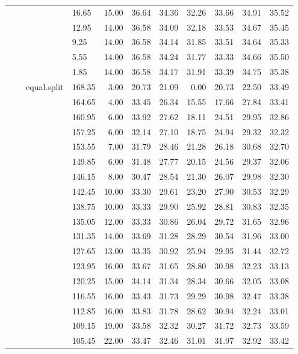 \begin{longtable}{llllrrrrrrr}
   &  &  & 16.65 & 15.00 & 36.64 & 34.36 & 32.26 & 33.66 & 34.91 & 35.52 \\ 
   &  &  & 12.95 & 14.00 & 36.58 & 34.09 & 32.18 & 33.53 & 34.67 & 35.45 \\ 
   &  &  & 9.25 & 14.00 & 36.58 & 34.14 & 31.85 & 33.51 & 34.64 & 35.33 \\ 
   &  &  & 5.55 & 14.00 & 36.58 & 34.24 & 31.77 & 33.33 & 34.66 & 35.50 \\ 
   &  &  & 1.85 & 14.00 & 36.58 & 34.17 & 31.91 & 33.39 & 34.75 & 35.38 \\ 
   &  & equal.split & 168.35 & 3.00 & 20.73 & 21.09 & 0.00 & 20.73 & 22.50 & 33.49 \\ 
   &  &  & 164.65 & 4.00 & 33.45 & 26.34 & 15.55 & 17.66 & 27.84 & 33.41 \\ 
   &  &  & 160.95 & 6.00 & 33.92 & 27.62 & 18.11 & 24.51 & 29.95 & 32.86 \\ 
   &  &  & 157.25 & 6.00 & 32.14 & 27.10 & 18.75 & 24.94 & 29.32 & 32.32 \\ 
   &  &  & 153.55 & 7.00 & 31.79 & 28.46 & 21.28 & 26.18 & 30.68 & 32.70 \\ 
   &  &  & 149.85 & 6.00 & 31.48 & 27.77 & 20.15 & 24.56 & 29.37 & 32.06 \\ 
   &  &  & 146.15 & 8.00 & 30.47 & 28.54 & 21.30 & 26.07 & 29.98 & 32.30 \\ 
   &  &  & 142.45 & 10.00 & 33.30 & 29.61 & 23.20 & 27.90 & 30.53 & 32.29 \\ 
   &  &  & 138.75 & 10.00 & 33.33 & 29.90 & 25.92 & 28.81 & 30.83 & 32.35 \\ 
   &  &  & 135.05 & 12.00 & 33.33 & 30.86 & 26.04 & 29.72 & 31.65 & 32.96 \\ 
   &  &  & 131.35 & 14.00 & 33.69 & 31.28 & 28.29 & 30.54 & 31.96 & 33.00 \\ 
   &  &  & 127.65 & 13.00 & 33.35 & 30.92 & 25.94 & 29.95 & 31.44 & 32.72 \\ 
   &  &  & 123.95 & 16.00 & 33.67 & 31.65 & 28.80 & 30.98 & 32.23 & 33.13 \\ 
   &  &  & 120.25 & 15.00 & 34.14 & 31.34 & 28.34 & 30.66 & 32.05 & 33.08 \\ 
   &  &  & 116.55 & 16.00 & 33.43 & 31.73 & 29.29 & 30.98 & 32.47 & 33.38 \\ 
   &  &  & 112.85 & 16.00 & 33.83 & 31.78 & 28.62 & 30.94 & 32.24 & 33.01 \\ 
   &  &  & 109.15 & 19.00 & 33.58 & 32.32 & 30.27 & 31.72 & 32.73 & 33.59 \\ 
   &  &  & 105.45 & 22.00 & 33.47 & 32.46 & 31.01 & 31.97 & 32.92 & 33.42 \\ 

\end{longtable}
